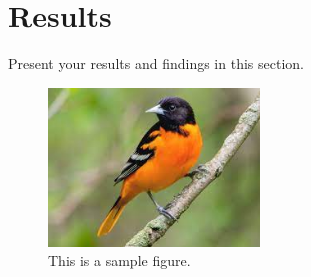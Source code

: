 \section{Results}
Present your results and findings in this section.

\begin{figure}[h]
    \centering
    \includegraphics[width=0.5\textwidth]{images/old/image.jpeg}
    \caption{This is a sample figure.}
    \label{fig:sample}
\end{figure}